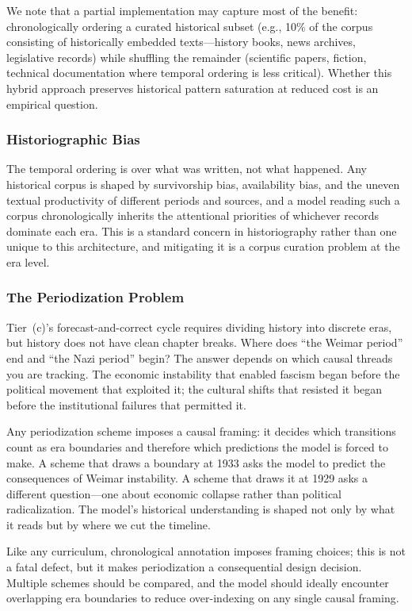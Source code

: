 We note that a partial implementation may capture most of the benefit: chronologically ordering a curated historical subset (e.g., 10\% of the corpus consisting of historically embedded texts---history books, news archives, legislative records) while shuffling the remainder (scientific papers, fiction, technical documentation where temporal ordering is less critical). Whether this hybrid approach preserves historical pattern saturation at reduced cost is an empirical question.

\subsubsection{Historiographic Bias}

The temporal ordering is over what was written, not what happened. Any historical corpus is shaped by survivorship bias, availability bias, and the uneven textual productivity of different periods and sources, and a model reading such a corpus chronologically inherits the attentional priorities of whichever records dominate each era. This is a standard concern in historiography rather than one unique to this architecture, and mitigating it is a corpus curation problem at the era level.

\subsubsection{The Periodization Problem}

Tier~(c)'s forecast-and-correct cycle requires dividing history into discrete eras, but history does not have clean chapter breaks. Where does ``the Weimar period'' end and ``the Nazi period'' begin? The answer depends on which causal threads you are tracking. The economic instability that enabled fascism began before the political movement that exploited it; the cultural shifts that resisted it began before the institutional failures that permitted it.

Any periodization scheme imposes a causal framing: it decides which transitions count as era boundaries and therefore which predictions the model is forced to make. A scheme that draws a boundary at 1933 asks the model to predict the consequences of Weimar instability. A scheme that draws it at 1929 asks a different question---one about economic collapse rather than political radicalization. The model's historical understanding is shaped not only by what it reads but by where we cut the timeline.

Like any curriculum, chronological annotation imposes framing choices; this is
not a fatal defect, but it makes periodization a consequential design decision.
Multiple schemes should be compared, and the model should ideally encounter
overlapping era boundaries to reduce over-indexing on any single causal framing.

